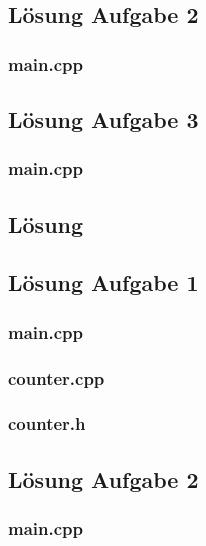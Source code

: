 \subsection{Lösung Aufgabe 2}
\subsubsection{main.cpp}

\subsection{Lösung Aufgabe 3}
\subsubsection{main.cpp}


\setcounter{section}{12}
\setcounter{subsection}{1}

\subsection{Lösung}
\subsection{Lösung Aufgabe 1}
\subsubsection{main.cpp}

\subsubsection{counter.cpp}

\subsubsection{counter.h}


\subsection{Lösung Aufgabe 2}
\subsubsection{main.cpp}

